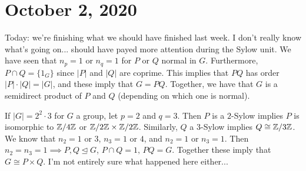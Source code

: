 \section{October 2, 2020}
Today: we're finishing what we should have finished last week. I don't really know what's going on... should have payed more attention during the Sylow unit. We have seen that $n_p=1$ or $n_q=1$ for $P$ or $Q$ normal in $G$. Furthermore, $P\cap Q=\{1_G\} $ since $|P|$ and $|Q|$ are coprime. This implies that $PQ$ has order $|P|\cdot |Q|=|G|$, and these imply that $G=PQ$. Together, we have that $G$ is a semidirect product of $P$ and $Q$ (depending on which one is normal).
\begin{example}
    If $|G|=2^2\cdot 3$ for $G$ a group, let $p=2$ and $q=3$. Then $P$ is a $2$-Sylow implies $P$ is isomorphic to $\mathbb{Z} /4\mathbb{Z}$ or $\mathbb{Z} /2\mathbb{Z}\times \mathbb{Z} /2\mathbb{Z}$. Similarly, $Q$ a $3$-Sylow implies $Q \cong \mathbb{Z} /3\mathbb{Z}$. We know that $n_2=1$ or $3$, $n_3=1$ or $4$, and $n_2=1$ or $n_3=1$. Then $n_2=n_3=1\implies P,Q\trianglelefteq G$, $P\cap Q=1,\,PQ=G$. Together these imply that $G\cong P\times Q$. I'm not entirely sure what happened here either...
\end{example}


